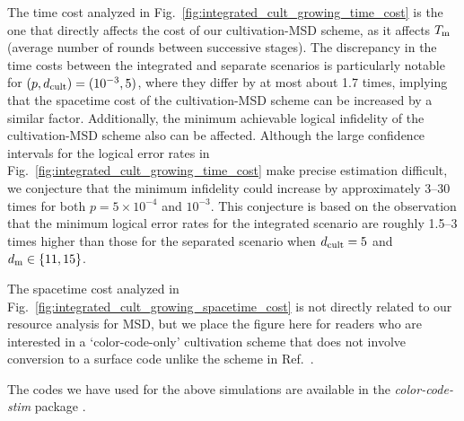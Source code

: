 \documentclass[
 prx,
 reprint,
 superscriptaddress,
 longbibliography,
 dvipsnames
]{revtex4-2}
\begin{document}
The time cost analyzed in Fig.~\ref{fig:integrated_cult_growing_time_cost} is the one that directly affects the cost of our cultivation-MSD scheme, as it affects $T_{\mathrm{m}}$ (average number of rounds between successive stages).
The discrepancy in the time costs between the integrated and separate scenarios is particularly notable for $(p, d_\mathrm{cult}) = (10^{-3}, 5)$, where they differ by at most about 1.7 times, implying that the spacetime cost of the cultivation-MSD scheme can be increased by a similar factor.
Additionally, the minimum achievable logical infidelity of the cultivation-MSD scheme also can be affected.
Although the large confidence intervals for the logical error rates in Fig.~\ref{fig:integrated_cult_growing_time_cost} make precise estimation difficult, we conjecture that the minimum infidelity could increase by approximately 3–30 times for both $p = 5 \times 10^{-4}$ and $10^{-3}$. This conjecture is based on the observation that the minimum logical error rates for the integrated scenario are roughly 1.5–3 times higher than those for the separated scenario when $d_\mathrm{cult} = 5$ and $d_{\mathrm{m}} \in \qty{11, 15}$.

The spacetime cost analyzed in Fig.~\ref{fig:integrated_cult_growing_spacetime_cost} is not directly related to our resource analysis for MSD, but we place the figure here for readers who are interested in a `color-code-only' cultivation scheme that does not involve conversion to a surface code unlike the scheme in Ref.~\cite{gidney2024magic}.

The codes we have used for the above simulations are available in the \textit{color-code-stim} package \cite{github:colorcodestim}.


\end{document}
